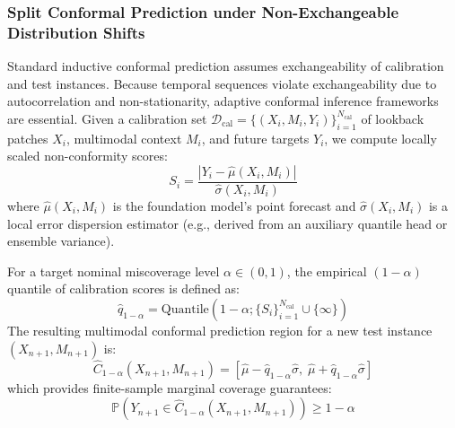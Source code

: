 \subsubsection{Split Conformal Prediction under Non-Exchangeable Distribution Shifts}
Standard inductive conformal prediction assumes exchangeability of calibration and test instances. Because temporal sequences violate exchangeability due to autocorrelation and non-stationarity, adaptive conformal inference frameworks are essential. Given a calibration set $\mathcal{D}_{\text{cal}} = \{(X_i, M_i, Y_i)\}_{i=1}^{N_{\text{cal}}}$ of lookback patches $X_i$, multimodal context $M_i$, and future targets $Y_i$, we compute locally scaled non-conformity scores:
\begin{equation}
    S_i = \frac{|Y_i - \hat{\mu}(X_i, M_i)|}{\hat{\sigma}(X_i, M_i)}
\end{equation}
where $\hat{\mu}(X_i, M_i)$ is the foundation model's point forecast and $\hat{\sigma}(X_i, M_i)$ is a local error dispersion estimator (e.g., derived from an auxiliary quantile head or ensemble variance).

For a target nominal miscoverage level $\alpha \in (0, 1)$, the empirical $(1-\alpha)$ quantile of calibration scores is defined as:
\begin{equation}
    \hat{q}_{1-\alpha} = \text{Quantile}\left(1 - \alpha; \{S_i\}_{i=1}^{N_{\text{cal}}} \cup \{\infty\}\right)
\end{equation}
The resulting multimodal conformal prediction region for a new test instance $(X_{n+1}, M_{n+1})$ is:
\begin{equation}
    \hat{C}_{1-\alpha}(X_{n+1}, M_{n+1}) = \left[ \hat{\mu} - \hat{q}_{1-\alpha} \hat{\sigma}, \; \hat{\mu} + \hat{q}_{1-\alpha} \hat{\sigma} \right]
\end{equation}
which provides finite-sample marginal coverage guarantees:
\begin{equation}
    \mathbb{P}\left( Y_{n+1} \in \hat{C}_{1-\alpha}(X_{n+1}, M_{n+1}) \right) \ge 1 - \alpha
\end{equation}

